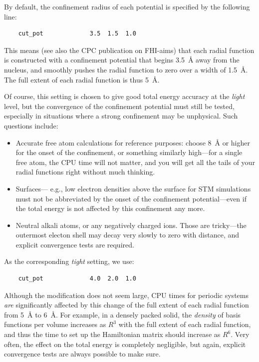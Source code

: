 By default, the confinement radius of each potential is specified by the
following line:
\begin{verbatim}
    cut_pot             3.5  1.5  1.0
\end{verbatim}
This means (see also the CPC publication on FHI-aims) that each radial
function is constructed with a confinement potential that begins 3.5~{\AA}
away from the nucleus, and smoothly pushes the radial function to zero over a
width of 1.5~{\AA}. The full extent of each radial function is thus 5~{\AA}. 

Of course, this setting is chosen to give good total energy accuracy at the
\emph{light} level, but the convergence of the confinement potential
must still be tested, especially in situations where a strong
confinement may be unphysical. Such questions include: 
\begin{itemize}
  \item Accurate free atom calculations for reference purposes: choose 8~{\AA}
  or higher for the onset of the confinement, or something similarly
  high---for a single free atom, the CPU time will not matter, and
  you will get
  all the tails of your radial functions right without much thinking.
  \item Surfaces--- e.g., low electron densities above the surface for STM
  simulations must not be abbreviated by the onset of the confinement
  potential---even if the total energy is not affected by this confinement any
  more. 
  \item Neutral alkali atoms, or any negatively charged ions. Those are
  tricky---the outermost electon shell may decay very slowly to zero with
  distance, and explicit convergence tests are required.
\end{itemize}

As the corresponding \emph{tight} setting, we use:
\begin{verbatim}
    cut_pot             4.0  2.0  1.0
\end{verbatim}
Although the modification does not seem large, CPU times for periodic systems
\emph{are} significantly affected by this change of the full extent of each
radial function from 5~{\AA} to 6~{\AA}. For example, in a densely
packed solid, the \emph{density} of basis functions per volume
increases as $R^3$ with the full extent of each radial function, and
thus the time to set up the Hamiltonian matrix should increase as
$R^6$. Very often, the effect on the total
energy is completely negligible, but again, explicit convergence tests are
always possible to make sure.

